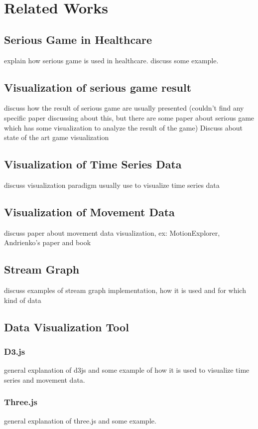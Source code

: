 \chapter{Related Works}
\section{Serious Game in Healthcare}
explain how serious game is used in healthcare. discuss some example.
\section{Visualization of serious game result} 
discuss how the result of serious game are usually presented (couldn't find any specific paper discussing about this, but there are some paper about serious game which has some visualization to analyze the result of the game)
Discuss about state of the art game visualization

\section{Visualization of Time Series Data}
discuss visualization paradigm usually use to visualize time series data
\section{Visualization of Movement Data}
discuss paper about movement data visualization, ex: MotionExplorer, Andrienko's paper and book
\section{Stream Graph}
discuss examples of stream graph implementation, how it is used and for which kind of data

\section{Data Visualization Tool}
\subsection{D3.js}
general explanation of d3js and some example of how it is used to visualize time series and movement data.

\subsection{Three.js}
general explanation of three.js and some example.

